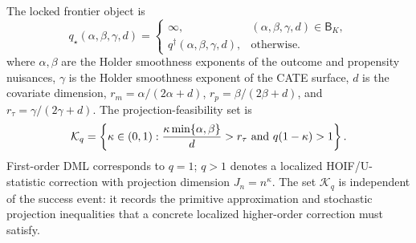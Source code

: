 \documentclass[11pt]{article}
\theoremstyle{definition}
\theoremstyle{plain}
\theoremstyle{remark}
\begin{document}
The locked frontier object is
\[
q_\star(\alpha,\beta,\gamma,d)=
\begin{cases}
\infty,&(\alpha,\beta,\gamma,d)\in\mathsf B_K,\\
q^\dagger(\alpha,\beta,\gamma,d),&\text{otherwise}.
\end{cases}
\]
where \(\alpha,\beta\) are the Holder smoothness exponents of the outcome and
propensity nuisances, \(\gamma\) is the Holder smoothness exponent of the CATE
surface, \(d\) is the covariate dimension,
\(r_m=\alpha/(2\alpha+d)\), \(r_p=\beta/(2\beta+d)\), and
\(r_\tau=\gamma/(2\gamma+d)\).  The projection-feasibility set is
\[
\mathcal K_q=\left\{\kappa\in(0,1):
{\kappa\min\{\alpha,\beta\}\over d}>r_\tau
\text{ and }q(1-\kappa)>1\right\}.
\]
First-order DML corresponds to \(q=1\); \(q>1\) denotes a localized
HOIF/U-statistic correction with projection dimension \(J_n=n^\kappa\).  The
set \(\mathcal K_q\) is independent of the success event: it records the
primitive approximation and stochastic projection inequalities that a concrete
localized higher-order correction must satisfy.

\begin{abstract}
This proposal asks where first-order Neyman-orthogonal DML stops being enough
for local CATE inference in the primitive Holder experiment studied by modern
minimax HTE theory.  The routine theorem records the exact first-order AIPW
drift for local CATE reports under an explicit localized nuisance-rate
condition: after cross-fitting, the population bias is a localized product of
outcome-regression and propensity errors.  The novel kernel is Conjecture
\ref{conj:order-frontier}: outside the published
Kennedy--Balakrishnan--Robins--Wasserman below-elbow region \(\mathsf B_K\),
the independently defined index \(q_\star(\alpha,\beta,\gamma,d)\), including
primitive projection feasibility through \(\mathcal K_q\), is the necessary
and sufficient orthogonalization order for oracle-rate Gaussian local CATE
inference.  Inside \(\mathsf B_K\), the proposal sets \(q_\star=\infty\),
reflecting the published full-class lower bound rather than a new
impossibility claim.  Thus the first-order impossibility itself is treated as
a published minimax calibration, not as the flagship novelty.  The new
question is whether this Kennedy-calibrated integer frontier, including the
\(q_\star=\infty\) case, is the minimal order at which localized HOIF
corrections recover oracle Gaussian local CATE inference whenever the
published lower bound leaves oracle inference possible.  Resolving the
conjecture would tell HTE researchers when to use ordinary DML, when to
construct a concrete localized HOIF correction, and when a claimed CATE
confidence interval is attempting a nonregular problem with a first-order
tool.
\end{abstract}
\end{document}
